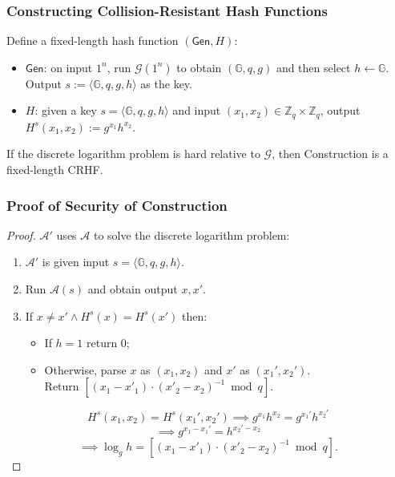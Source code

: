 \begin{frame}\frametitle{Constructing Collision-Resistant Hash Functions}
\begin{construction}
Define a fixed-length hash function $(\mathsf{Gen}, H)$:
\begin{itemize}
\item $\mathsf{Gen}$: on input $1^n$, run $\mathcal{G}(1^n)$ to obtain $(\mathbb{G},q,g)$ and then select $h \gets \mathbb{G}$. Output $s := \langle \mathbb{G}, q,g,h\rangle$ as the key.
\item $H$: given a key $s = \langle \mathbb{G}, q,g,h\rangle$ and input $(x_1,x_2) \in \mathbb{Z}_q \times \mathbb{Z}_q$, output $H^s(x_1,x_2) := g^{x_1}h^{x_2}$.
\end{itemize}
\end{construction}
\begin{theorem}
If the discrete logarithm problem is hard relative to $\mathcal{G}$, then Construction is a fixed-length CRHF.
\end{theorem}
\end{frame}
\begin{frame}\frametitle{Proof of Security of Construction}
\begin{proof}
$\mathcal{A}'$ uses $\mathcal{A}$ to solve the discrete logarithm problem:
\begin{enumerate}
\item $\mathcal{A}'$ is given input $s=\langle \mathbb{G},q,g,h\rangle$.
\item Run $\mathcal{A}(s)$ and obtain output $x, x'$.
\item If $x \neq x' \land H^s(x) = H^s(x')$ then:
\begin{itemize}
\item If $h=1$ return 0;
\item Otherwise, parse $x$ as $(x_1,x_2)$ and $x'$ as $(x_1',x_2')$. \\
Return $[(x_1-x'_1)\cdot (x'_2-x_2)^{-1} \bmod q]$.
\end{itemize}
\end{enumerate}
\[  H^s(x_1,x_2) = H^s(x_1',x_2') \implies g^{x_1}h^{x_2} = g^{x_1'}h^{x_2'} \]
\[ \implies g^{x_1-x_1'} = h^{x_2'-x_2} \]
\[ \implies \log_gh = [(x_1-x'_1)\cdot (x'_2-x_2)^{-1} \bmod q]. \]
\end{proof}
\end{frame}
